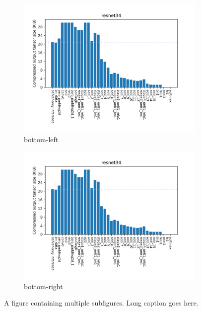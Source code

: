 \begin{figure}[htb]
\begin{subfigure}{.5\linewidth}
    \includegraphics[width=\linewidth]{img/sample.png}
    \caption{bottom-left}
  \end{subfigure}%
  \begin{subfigure}{.5\linewidth}
    \centering
    \includegraphics[width=\linewidth]{img/sample.png}
    \caption{bottom-right}
  \end{subfigure}
  \caption[Multiple subfigures example]{%
    A figure containing multiple subfigures. Long caption goes here.%
  }
  \label{fig:sample_figure_grid}
\end{figure}
